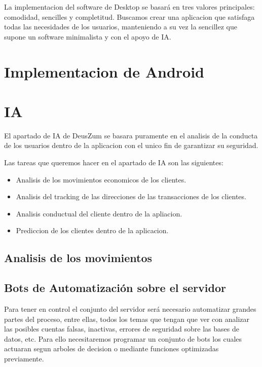 \documentclass{article}
\theoremstyle{definition}
\begin{document}
La implementacion del software de Desktop se basará en tres valores principales: comodidad, sencilles y completitud. Buscamos crear una aplicacion que satisfaga todas las necesidades de los usuarios, manteniendo a su vez la sencillez que supone un software minimalista y con el apoyo de IA.




\section{Implementacion de Android}




\section{IA}

El apartado de IA de DeusZum se basara puramente en el analisis de la conducta de los usuarios dentro de la aplicacion con el unico fin de garantizar su seguridad.

Las tareas que queremos hacer en el apartado de IA son las siguientes:

\begin{itemize}
    \item Analisis de los movimientos economicos de los clientes.
    \item Analisis del tracking de las direcciones de las transacciones de los clientes.
    \item Analisis conductual del cliente dentro de la apliacion.
    \item Prediccion de los clientes dentro de la aplicacion.
\end{itemize}


\subsection{Analisis de los movimientos}

\subsection{Bots de Automatización sobre el servidor}

Para tener en control el conjunto del servidor será necesario automatizar grandes partes del proceso, entre ellas, todos los temas que tengan que ver con analizar las posibles cuentas falsas, inactivas, errores de seguridad sobre las bases de datos, etc. Para ello necesitaremos programar un conjunto de bots los cuales actuaran segun arboles de decision o mediante funciones optimizadas previamente.
\end{document}
